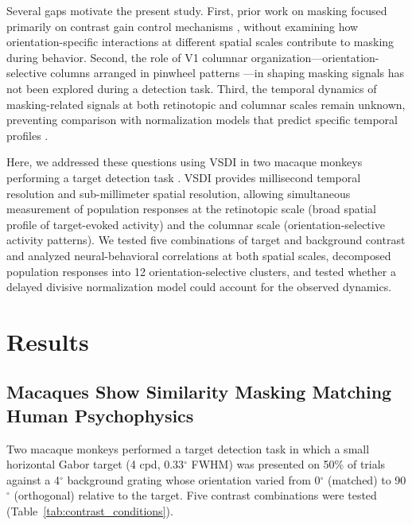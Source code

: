 \documentclass[11pt]{article}
\begin{document}
Several gaps motivate the present study. First, prior work on masking focused primarily on contrast gain control mechanisms \citep{heeger1992, carandini2012}, without examining how orientation-specific interactions at different spatial scales contribute to masking during behavior. Second, the role of V1 columnar organization---orientation-selective columns arranged in pinwheel patterns \citep{bonhoeffer1991, blasdel1986}---in shaping masking signals has not been explored during a detection task. Third, the temporal dynamics of masking-related signals at both retinotopic and columnar scales remain unknown, preventing comparison with normalization models that predict specific temporal profiles \citep{schwartz2001, carandini2012}.

Here, we addressed these questions using VSDI in two macaque monkeys performing a target detection task \citep{grinvald1999, seidemann2009}. VSDI provides millisecond temporal resolution and sub-millimeter spatial resolution, allowing simultaneous measurement of population responses at the retinotopic scale (broad spatial profile of target-evoked activity) and the columnar scale (orientation-selective activity patterns). We tested five combinations of target and background contrast and analyzed neural-behavioral correlations at both spatial scales, decomposed population responses into 12 orientation-selective clusters, and tested whether a delayed divisive normalization model could account for the observed dynamics.

\section{Results}

\subsection{Macaques Show Similarity Masking Matching Human Psychophysics}

Two macaque monkeys performed a target detection task in which a small horizontal Gabor target (4 cpd, 0.33$^\circ$ FWHM) was presented on 50\% of trials against a 4$^\circ$ background grating whose orientation varied from 0$^\circ$ (matched) to 90$^\circ$ (orthogonal) relative to the target. Five contrast combinations were tested (Table~\ref{tab:contrast_conditions}).
\end{document}
